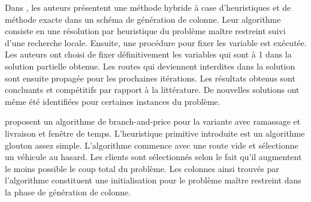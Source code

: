 \documentclass[12pt,a4paper,oneside]{book}
\theoremstyle{definition}
\begin{document}
	    Dans \cite{Cacchiani2014}, les auteurs présentent une méthode hybride à case d'heuristiques et de méthode exacte dans un schéma de génération de colonne. Leur algorithme consiste en une résolution par heuristique du problème maître restreint suivi d'une recherche locale. Ensuite, une procédure pour fixer les variable est exécutée. Les auteurs ont choisi de fixer définitivement les variables qui sont à 1 dans la solution partielle obtenue. Les routes qui deviennent interdites dans la solution sont ensuite propagée pour les prochaines itérations. Les résultats obtenus sont concluants et compétitifs par rapport à la littérature. De nouvelles solutions ont même été identifiées pour certaines instances du problème.
	    
	    \cite{Bettinelli2014} proposent un algorithme de branch-and-price pour la variante avec ramassage et livraison et fenêtre de temps. L'heuristique primitive introduite est un algorithme glouton assez simple. L'algorithme commence avec une route vide et sélectionne un véhicule au hasard. Les clients sont sélectionnés selon le fait qu'il augmentent le moins possible le coup total du problème. Les colonnes ainsi trouvés par l'algorithme constituent une initialisation pour le problème maître restreint dans la phase de génération de colonne. 
	    
\end{document}
